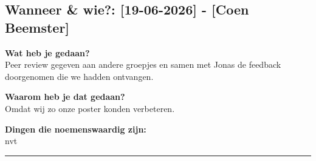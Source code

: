 
\subsection*{Wanneer \& wie?: [19-06-2026] - [Coen Beemster]}

\textbf{Wat heb je gedaan?}\\
Peer review gegeven aan andere groepjes en samen met Jonas de feedback doorgenomen die we hadden ontvangen.
\vspace{0.3cm} 

\noindent \textbf{Waarom heb je dat gedaan?}\\
Omdat wij zo onze poster konden verbeteren.

\noindent \textbf{Dingen die noemenswaardig zijn:}\\
nvt


\vspace{0.5cm}
\hrule 
\vspace{0.5cm}